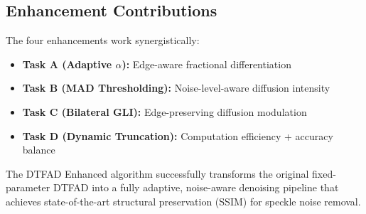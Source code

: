 \documentclass[12pt,a4paper]{article}
\begin{document}
\subsection{Enhancement Contributions}

The four enhancements work synergistically:
\begin{itemize}
\item \textbf{Task A (Adaptive $\alpha$):} Edge-aware fractional differentiation
\item \textbf{Task B (MAD Thresholding):} Noise-level-aware diffusion intensity
\item \textbf{Task C (Bilateral GLI):} Edge-preserving diffusion modulation
\item \textbf{Task D (Dynamic Truncation):} Computation efficiency + accuracy balance
\end{itemize}

The DTFAD Enhanced algorithm successfully transforms the original fixed-parameter DTFAD into a fully adaptive, noise-aware denoising pipeline that achieves state-of-the-art structural preservation (SSIM) for speckle noise removal.
\end{document}
